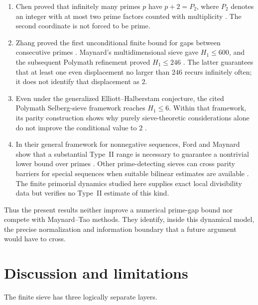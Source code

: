\documentclass[11pt]{article}
\theoremstyle{definition}
\theoremstyle{remark}
\begin{document}
\begin{enumerate}[label=(\roman*),leftmargin=2.2em]
    \item Chen proved that infinitely many primes $p$ have $p+2=P_2$, where $P_2$ denotes an integer with at most two prime factors counted with multiplicity \citep{Chen1973}.  The second coordinate is not forced to be prime.

    \item Zhang proved the first unconditional finite bound for gaps between consecutive primes \citep{Zhang2014}.  Maynard's multidimensional sieve gave $H_1\le600$, and the subsequent Polymath refinement proved $H_1\le246$ \citep{Maynard2015,DHJPolymath2014}.  The latter guarantees that at least one even displacement no larger than $246$ recurs infinitely often; it does not identify that displacement as $2$.

    \item Even under the generalized Elliott--Halberstam conjecture, the cited Polymath Selberg-sieve framework reaches $H_1\le6$.  Within that framework, its parity construction shows why purely sieve-theoretic considerations alone do not improve the conditional value to $2$ \citep{DHJPolymath2014}.

    \item In their general framework for nonnegative sequences, Ford and Maynard show that a substantial Type~II range is necessary to guarantee a nontrivial lower bound over primes \citep{FordMaynard2024}.  Other prime-detecting sieves can cross parity barriers for special sequences when suitable bilinear estimates are available \citep{FriedlanderIwaniec1998}.  The finite primorial dynamics studied here supplies exact local divisibility data but verifies no Type~II estimate of this kind.
\end{enumerate}

Thus the present results neither improve a numerical prime-gap bound nor compete with Maynard--Tao methods.  They identify, inside this dynamical model, the precise normalization and information boundary that a future argument would have to cross.

\section{Discussion and limitations}\label{sec:discussion}

The finite sieve has three logically separate layers.
\end{document}
